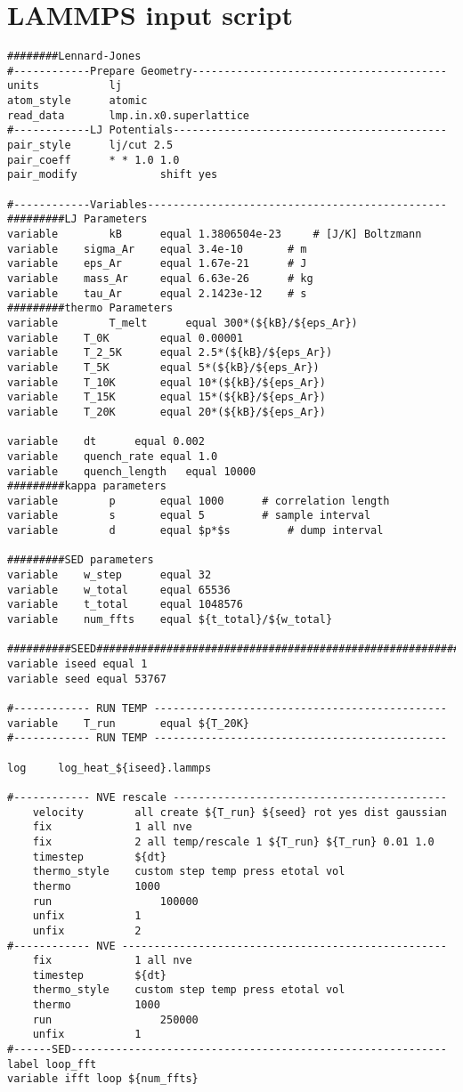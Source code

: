 \chapter{LAMMPS input script} \label{appendixd}
\begin{singlespace}
\begin{verbatim}
########Lennard-Jones
#------------Prepare Geometry----------------------------------------
units			lj
atom_style		atomic
read_data		lmp.in.x0.superlattice
#------------LJ Potentials-------------------------------------------
pair_style		lj/cut 2.5
pair_coeff		* * 1.0 1.0
pair_modify          	shift yes

#------------Variables-----------------------------------------------
#########LJ Parameters
variable    	kB 		equal 1.3806504e-23 	# [J/K] Boltzmann
variable	sigma_Ar 	equal 3.4e-10 		# m
variable	eps_Ar		equal 1.67e-21		# J
variable	mass_Ar		equal 6.63e-26		# kg
variable	tau_Ar		equal 2.1423e-12	# s
#########thermo Parameters
variable    	T_melt 		equal 300*(${kB}/${eps_Ar})
variable	T_0K		equal 0.00001
variable	T_2_5K		equal 2.5*(${kB}/${eps_Ar})
variable	T_5K		equal 5*(${kB}/${eps_Ar})
variable	T_10K		equal 10*(${kB}/${eps_Ar})
variable	T_15K		equal 15*(${kB}/${eps_Ar})
variable	T_20K		equal 20*(${kB}/${eps_Ar})

variable   	dt 		equal 0.002
variable	quench_rate	equal 1.0
variable	quench_length 	equal 10000
#########kappa parameters
variable    	p 		equal 1000 		# correlation length
variable    	s 		equal 5  		# sample interval
variable    	d 		equal $p*$s 		# dump interval 

#########SED parameters
variable	w_step		equal 32		
variable	w_total		equal 65536
variable	t_total		equal 1048576
variable	num_ffts	equal ${t_total}/${w_total}

##########SEED##########################################################
variable iseed equal 1
variable seed equal 53767 	

#------------ RUN TEMP ----------------------------------------------	
variable 	T_run 		equal ${T_20K}
#------------ RUN TEMP ----------------------------------------------

log 	log_heat_${iseed}.lammps

#------------ NVE rescale -------------------------------------------	
	velocity 		all create ${T_run} ${seed} rot yes dist gaussian
	fix 			1 all nve
	fix 			2 all temp/rescale 1 ${T_run} ${T_run} 0.01 1.0
	timestep		${dt}
	thermo_style  	custom step temp press etotal vol
	thermo			1000
	run             	100000	
	unfix 			1
	unfix 			2
#------------ NVE ---------------------------------------------------	
	fix 			1 all nve
	timestep		${dt}
	thermo_style  	custom step temp press etotal vol
	thermo			1000
	run             	250000	
	unfix 			1
#------SED-----------------------------------------------------------
label loop_fft
variable ifft loop ${num_ffts}


\end{verbatim}
\end{singlespace}
